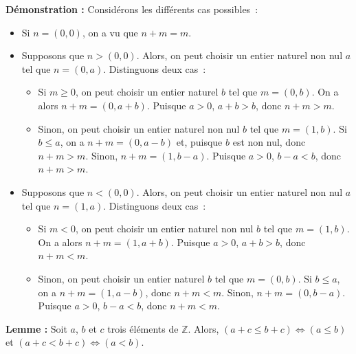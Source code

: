 \noindent\textbf{Démonstration :} 
    Considérons les différents cas possibles : 
    \begin{itemize}[nosep]
        \item Si $n = (0,0)$, on a vu que $n + m = m$.
        \item Supposons que $n > (0,0)$. Alors, on peut choisir un entier naturel non nul $a$ tel que $n = (0,a)$.
            Distinguons deux cas : 
            \begin{itemize}[nosep]
                \item Si $m \geq 0$, on peut choisir un entier naturel $b$ tel que $m = (0,b)$.
                    On a alors $n + m = (0, a + b)$. 
                    Puisque $a > 0$, $a + b > b$, donc $n + m > m$.
                \item Sinon, on peut choisir un entier naturel non nul $b$ tel que $m = (1,b)$.
                    Si $b \leq a$, on a $n+m = (0, a-b)$ et, puisque $b$ est non nul, donc $n+m > m$.
                    Sinon, $n+m = (1,b-a)$. 
                    Puisque $a > 0$, $b-a < b$, donc $n+m > m$.
            \end{itemize}
        \item Supposons que $n < (0,0)$. Alors, on peut choisir un entier naturel non nul $a$ tel que $n = (1,a)$.
            Distinguons deux cas : 
            \begin{itemize}[nosep]
                \item Si $m < 0$, on peut choisir un entier naturel non nul $b$ tel que $m = (1,b)$.
                    On a alors $n + m = (1, a + b)$. 
                    Puisque $a > 0$, $a + b > b$, donc $n + m < m$.
                \item Sinon, on peut choisir un entier naturel $b$ tel que $m = (0,b)$.
                    Si $b \leq a$, on a $n+m = (1, a-b)$, donc $n+m < m$.
                    Sinon, $n+m = (0,b-a)$. 
                    Puisque $a > 0$, $b-a < b$, donc $n+m < m$.
            \end{itemize}
    \end{itemize}

    \done

\medskip

\noindent\textbf{Lemme :} Soit $a$, $b$ et $c$ trois éléments de $\mathbb{Z}$.
    Alors, $(a + c \leq b + c) \Leftrightarrow (a \leq b)$ et $(a + c < b + c) \Leftrightarrow (a < b)$.

\medskip

